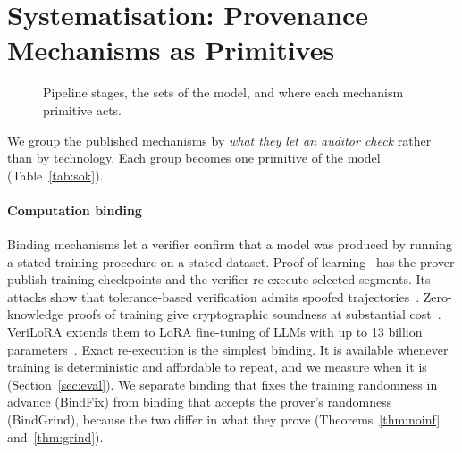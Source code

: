 \section{Systematisation: Provenance Mechanisms as Primitives}\label{sec:sok}

\begin{figure}[t]
\centering
{}
\caption{Pipeline stages, the sets of the model, and where each mechanism primitive acts.}
\label{fig:pipeline}
\end{figure}

We group the published mechanisms by \emph{what they let an auditor check} rather than by
technology. Each group becomes one primitive of the model (Table~\ref{tab:sok}).

\paragraph{Computation binding}
Binding mechanisms let a verifier confirm that a model was produced by running a stated
training procedure on a stated dataset. Proof-of-learning~\cite{jia2021pol} has the prover
publish training checkpoints and the verifier re-execute selected segments. Its attacks
show that tolerance-based verification admits spoofed trajectories~\cite{fang2023pol}.
Zero-knowledge proofs of training give cryptographic soundness at substantial
cost~\cite{abbaszadeh2024zkpot,tan2025zkpot}. VeriLoRA extends them to LoRA fine-tuning of
LLMs with up to 13 billion parameters~\cite{liao2026verilora}. Exact re-execution is the
simplest binding. It is available whenever training is deterministic and affordable to
repeat, and we measure when it is (Section~\ref{sec:eval}). We separate binding that fixes
the training randomness in advance (\textsf{BindFix}) from binding that accepts the
prover's randomness (\textsf{BindGrind}), because the two differ in what they prove
(Theorems~\ref{thm:noinf} and~\ref{thm:grind}).

